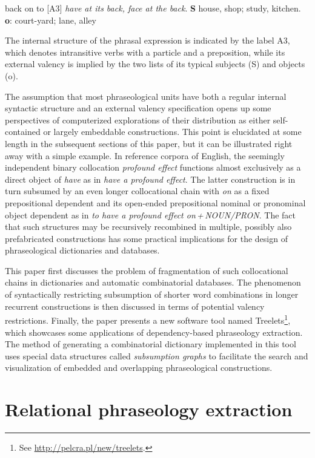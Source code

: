 \documentclass[output=paper]{langscibook}
\begin{document}
\ea
back on to [A3] \textit{have at its back, face at the back}. \textbf{S} house, shop; study, kitchen. \textbf{o}: court-yard; lane, alley
\z

The internal structure of the phrasal expression is indicated by the label A3, which denotes intransitive verbs with a particle and a preposition, while its external valency is implied by the two lists of its typical subjects (S) and objects (o).

The assumption that most phraseological units have both a regular internal syntactic structure and an external valency specification opens up some perspectives of computerized explorations of their distribution as either self-contained or largely embeddable constructions. This point is elucidated at some length in the subsequent sections of this paper, but it can be illustrated right away with a simple example. In reference corpora of English, the seemingly independent binary collocation \textit{profound effect} functions almost exclusively as a direct object of \textit{have} as in \textit{have a profound effect}. The latter construction is in turn subsumed by an even longer collocational chain with \textit{on} as a fixed prepositional dependent and its open-ended prepositional nominal or pronominal object dependent as in \textit{to have a profound effect on\,+\,NOUN/PRON}. The fact that such structures may be recursively recombined in multiple, possibly also prefabricated constructions has some practical implications for the design of phraseological dictionaries and databases. 

This paper first discusses the problem of fragmentation of such collocational chains in dictionaries and automatic combinatorial databases. The phenomenon of syntactically restricting subsumption of shorter word combinations in longer recurrent constructions is then discussed  in terms of potential valency restrictions. Finally, the paper presents a new software tool named Treelets\footnote{See \url{http://pelcra.pl/new/treelets}.}, which showcases some applications of dependency-based phraseology extraction. The method of generating a combinatorial dictionary implemented in this tool uses special data structures called \textit{subsumption graphs} to facilitate the search and visualization of embedded and overlapping phraseological constructions.

\section{Relational phraseology extraction}
\end{document}
